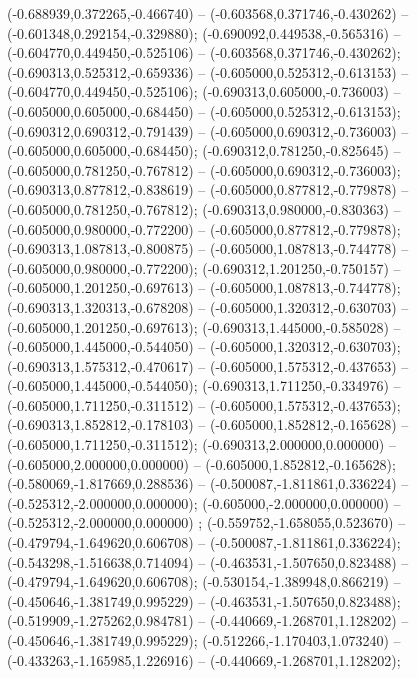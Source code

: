  (-0.688939,0.372265,-0.466740) -- (-0.603568,0.371746,-0.430262) -- (-0.601348,0.292154,-0.329880);
 (-0.690092,0.449538,-0.565316) -- (-0.604770,0.449450,-0.525106) -- (-0.603568,0.371746,-0.430262);
 (-0.690313,0.525312,-0.659336) -- (-0.605000,0.525312,-0.613153) -- (-0.604770,0.449450,-0.525106);
 (-0.690313,0.605000,-0.736003) -- (-0.605000,0.605000,-0.684450) -- (-0.605000,0.525312,-0.613153);
 (-0.690312,0.690312,-0.791439) -- (-0.605000,0.690312,-0.736003) -- (-0.605000,0.605000,-0.684450);
 (-0.690312,0.781250,-0.825645) -- (-0.605000,0.781250,-0.767812) -- (-0.605000,0.690312,-0.736003);
 (-0.690313,0.877812,-0.838619) -- (-0.605000,0.877812,-0.779878) -- (-0.605000,0.781250,-0.767812);
 (-0.690313,0.980000,-0.830363) -- (-0.605000,0.980000,-0.772200) -- (-0.605000,0.877812,-0.779878);
 (-0.690313,1.087813,-0.800875) -- (-0.605000,1.087813,-0.744778) -- (-0.605000,0.980000,-0.772200);
 (-0.690312,1.201250,-0.750157) -- (-0.605000,1.201250,-0.697613) -- (-0.605000,1.087813,-0.744778);
 (-0.690313,1.320313,-0.678208) -- (-0.605000,1.320312,-0.630703) -- (-0.605000,1.201250,-0.697613);
 (-0.690313,1.445000,-0.585028) -- (-0.605000,1.445000,-0.544050) -- (-0.605000,1.320312,-0.630703);
 (-0.690313,1.575312,-0.470617) -- (-0.605000,1.575312,-0.437653) -- (-0.605000,1.445000,-0.544050);
 (-0.690313,1.711250,-0.334976) -- (-0.605000,1.711250,-0.311512) -- (-0.605000,1.575312,-0.437653);
 (-0.690313,1.852812,-0.178103) -- (-0.605000,1.852812,-0.165628) -- (-0.605000,1.711250,-0.311512);
 (-0.690313,2.000000,0.000000) -- (-0.605000,2.000000,0.000000) -- (-0.605000,1.852812,-0.165628);
 (-0.580069,-1.817669,0.288536) -- (-0.500087,-1.811861,0.336224) -- (-0.525312,-2.000000,0.000000);
 (-0.605000,-2.000000,0.000000) -- (-0.525312,-2.000000,0.000000) ;
 (-0.559752,-1.658055,0.523670) -- (-0.479794,-1.649620,0.606708) -- (-0.500087,-1.811861,0.336224);
 (-0.543298,-1.516638,0.714094) -- (-0.463531,-1.507650,0.823488) -- (-0.479794,-1.649620,0.606708);
 (-0.530154,-1.389948,0.866219) -- (-0.450646,-1.381749,0.995229) -- (-0.463531,-1.507650,0.823488);
 (-0.519909,-1.275262,0.984781) -- (-0.440669,-1.268701,1.128202) -- (-0.450646,-1.381749,0.995229);
 (-0.512266,-1.170403,1.073240) -- (-0.433263,-1.165985,1.226916) -- (-0.440669,-1.268701,1.128202);
